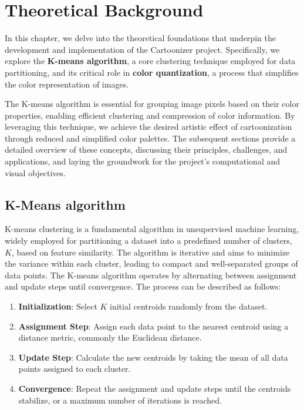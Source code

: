 \chapter{Theoretical Background}

In this chapter, we delve into the theoretical foundations that underpin the development and implementation of the Cartoonizer project. Specifically, we explore the \textbf{K-means algorithm}, a core clustering technique employed for data partitioning, and its critical role in \textbf{color quantization}, a process that simplifies the color representation of images. 

The K-means algorithm is essential for grouping image pixels based on their color properties, enabling efficient clustering and compression of color information. By leveraging this technique, we achieve the desired artistic effect of cartoonization through reduced and simplified color palettes. The subsequent sections provide a detailed overview of these concepts, discussing their principles, challenges, and applications, and laying the groundwork for the project's computational and visual objectives.

\section{K-Means algorithm}
K-means clustering is a fundamental algorithm in unsupervised machine learning, widely employed for partitioning a dataset into a predefined number of clusters, \( K \), based on feature similarity. The algorithm is iterative and aims to minimize the variance within each cluster, leading to compact and well-separated groups of data points.
The K-means algorithm operates by alternating between assignment and update steps until convergence. The process can be described as follows:

\begin{enumerate}
    \item \textbf{Initialization}: Select \( K \) initial centroids randomly from the dataset.
    \item \textbf{Assignment Step}: Assign each data point to the nearest centroid using a distance metric, commonly the Euclidean distance.
    \item \textbf{Update Step}: Calculate the new centroids by taking the mean of all data points assigned to each cluster.
    \item \textbf{Convergence}: Repeat the assignment and update steps until the centroids stabilize, or a maximum number of iterations is reached.
\end{enumerate}


